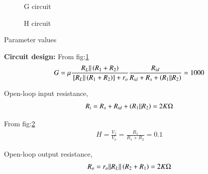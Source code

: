 \begin{enumerate}[label=\thesubsection.\arabic*.,ref=\thesubsection.\theenumi]
\begin{figure}[!h]
		\resizebox{\columnwidth}{!}{}
\caption{G circuit}
\label{fig:ee18btech11039_fig4}
\end{figure}

\begin{figure}[!h]
		\resizebox{\columnwidth}{!}{}
\caption{H circuit}
\label{fig:ee18btech11039_fig5}
\end{figure}

\begin{table}[!h]
\centering

\caption{Parameter values}
\label{table:ee18btech11039_tab2}
\end{table}

\textbf{Circuit design: }
From fig:\ref{fig:ee18btech11039_fig4}
\begin{align}
G = \mu \frac{R_L || \left(R_1 + R_2\right)}{{}\left[R_L || \left(R_1 + R_2\right)\right]+r_o} \frac{R_{id}}{R_{id}+R_s+\left(R_1||R_2\right)} = 1000
\end{align}

Open-loop input resistance,
\begin{align}
     R_i =  R_s + R_{id} + \left(R_1 || R_2\right) = 2K\ohm
\end{align}

From fig:\ref{fig:ee18btech11039_fig5}
\begin{align}
H = \frac{V_f}{V_o} = \frac{R_1}{R_1 + R_2} = 0.1
\end{align}

Open-loop output resistance,
\begin{align}
      R_o = r_o || R_L || \left(R_2 + R_1\right) = 2K\ohm
\end{align}


\end{enumerate}
